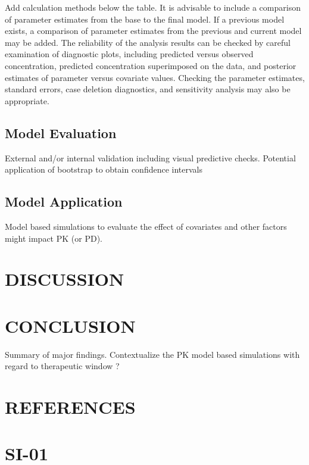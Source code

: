 \documentclass[
  letterpaper,
  toc=chapterentrywithdots,
  11pt,
  headings=small]{scrreprt}
\newlength{\cslhangindent}
\newlength{\cslentryspacingunit} %
\newenvironment{CSLReferences}[2] %
 {%
  \setlength{\parindent}{0pt}
  \ifodd #1
  \let\oldpar\par
  \def\par{\hangindent=\cslhangindent\oldpar}
  \fi
  \setlength{\parskip}{#2\cslentryspacingunit}
 }%
 {}
\begin{document}
Add calculation methods below the table. It is advisable to include a
comparison of parameter estimates from the base to the final model. If a
previous model exists, a comparison of parameter estimates from the
previous and current model may be added. The reliability of the analysis
results can be checked by careful examination of diagnostic plots,
including predicted versus observed concentration, predicted
concentration superimposed on the data, and posterior estimates of
parameter versus covariate values. Checking the parameter estimates,
standard errors, case deletion diagnostics, and sensitivity analysis may
also be appropriate.

\hypertarget{model-evaluation}{%
\section{Model Evaluation}\label{model-evaluation}}

External and/or internal validation including visual predictive checks.
Potential application of bootstrap to obtain confidence intervals

\hypertarget{model-application}{%
\section{Model Application}\label{model-application}}

Model based simulations to evaluate the effect of covariates and other
factors might impact PK (or PD).


\hypertarget{sec-discussion}{%
\chapter{DISCUSSION}\label{sec-discussion}}


\hypertarget{sec-conclusion}{%
\chapter{CONCLUSION}\label{sec-conclusion}}

Summary of major findings. Contextualize the PK model based simulations
with regard to therapeutic window ?


\hypertarget{references}{%
\chapter{REFERENCES}\label{references}}

\hypertarget{refs}{}
\begin{CSLReferences}{0}{0}
\end{CSLReferences}

\cleardoublepage
{}
{}
\appendix

\hypertarget{si-01}{%
\chapter{SI-01}\label{si-01}}
\end{document}
